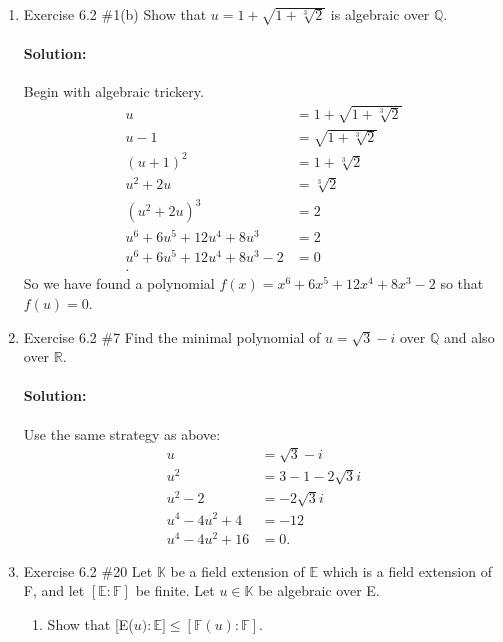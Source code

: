 \documentclass{article}
\begin{document}
\begin{enumerate} 

    \item Exercise 6.2 \#1(b) Show that $u=1+\sqrt{1+\sqrt[3]{2}}$ is algebraic over $\mathbb{Q}.$

        \paragraph{Solution:} Begin with algebraic trickery.
        \begin{align*}
            u&=1+\sqrt{1+\sqrt[3]{2}}\\
            u-1&= \sqrt{1+\sqrt[3]{2}} \\
            (u+1)^2&= 1+\sqrt[3]{2}  \\
            u^2+2u&= \sqrt[3]{2}  \\
            (u^2+2u)^3&= 2 \\
            u^6 + 6 u^5 + 12 u^4 + 8 u^3&= 2 \\
            u^6 + 6 u^5 + 12 u^4 + 8 u^3-2&= 0 \\
        .\end{align*}
        So we have found a polynomial $f(x)= x^6 + 6 x^5 + 12 x^4 + 8 x^3-2$ so that $f(u)=0$.

\item Exercise 6.2 \#7 Find the minimal polynomial of $u=\sqrt{3}-i$ over $\mathbb{Q}$ and also over
$\mathbb{R}.$

\paragraph{Solution: }Use the same strategy as above:
\begin{align*}
    u&= \sqrt{3}-i  \\
    u^2&= 3-1-2\sqrt{3} i \\
    u^2-2&= -2\sqrt{3} i \\
    u^{4}-4u^2+4&= -12 \\
    u^{4}-4u^2+16&= 0 
.\end{align*}


\item Exercise 6.2 \#20 Let $\mathbb{K}$ be a field extension of $\mathbb{E}$ which is a field extension of F,
    and let $[\mathbb{E}:\mathbb{F}]$ be finite. Let $u\in\mathbb{K}$ be algebraic over E.
\begin{enumerate}              
    \item Show that [E($u):\mathbb{E}]\leq[\mathbb{F}(u):\mathbb{F}].$

\end{enumerate}
\end{enumerate}
\end{document}
